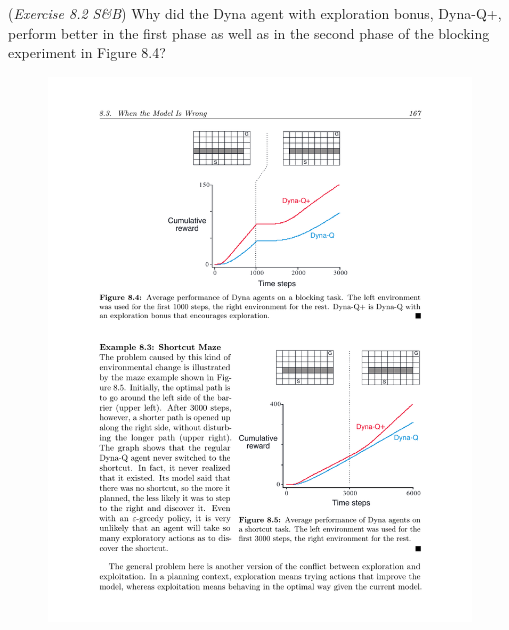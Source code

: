 (\textit{Exercise 8.2 S\&B})
Why did the Dyna agent with exploration bonus, Dyna-Q+, perform better in the
first phase as well as in the second phase of the blocking experiment in Figure 8.4?
\begin{figure}[h!]
  \center
\includegraphics[width=0.7\linewidth]{figures/c2m4_fig_8dot4.pdf}
\end{figure}
